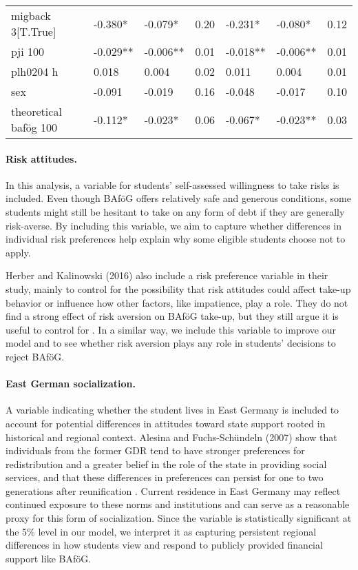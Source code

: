 \begin{table}[htbp]
\begin{tabular}{lllllll}
migback 3[T.True]       & -0.380*   & -0.079*    & 0.20     & -0.231*   & -0.080*    & 0.12     \\
pji 100                 & -0.029**  & -0.006**   & 0.01     & -0.018**  & -0.006**   & 0.01     \\
plh0204 h               & 0.018     & 0.004      & 0.02     & 0.011     & 0.004      & 0.01     \\
sex                     & -0.091    & -0.019     & 0.16     & -0.048    & -0.017     & 0.10     \\
theoretical bafög 100   & -0.112*   & -0.023*    & 0.06     & -0.067*   & -0.023**   & 0.03     \\
\bottomrule
\end{tabular}
\end{table}


\paragraph{Risk attitudes.} In this analysis, a variable for students' self-assessed willingness to take risks is included. Even though BAföG offers relatively safe and generous conditions, some students might still be hesitant to take on any form of debt if they are generally risk-averse. By including this variable, we aim to capture whether differences in individual risk preferences help explain why some eligible students choose not to apply.

Herber and Kalinowski (2016) also include a risk preference variable in their study, mainly to control for the possibility that risk attitudes could affect take-up behavior or influence how other factors, like impatience, play a role. They do not find a strong effect of risk aversion on BAföG take-up, but they still argue it is useful to control for \citep{herber_non-take-up_2019}. In a similar way, we include this variable to improve our model and to see whether risk aversion plays any role in students’ decisions to reject BAföG.

\paragraph{East German socialization.}  A variable indicating whether the student lives in East Germany is included to account for potential differences in attitudes toward state support rooted in historical and regional context. Alesina and Fuchs-Schündeln (2007) show that individuals from the former GDR tend to have stronger preferences for redistribution and a greater belief in the role of the state in providing social services, and that these differences in preferences can persist for one to two generations after reunification \citep{alesina_good-bye_2007}. Current residence in East Germany may reflect continued exposure to these norms and institutions and can serve as a reasonable proxy for this form of socialization. Since the variable is statistically significant at the 5\% level in our model, we interpret it as capturing persistent regional differences in how students view and respond to publicly provided financial support like BAföG.

